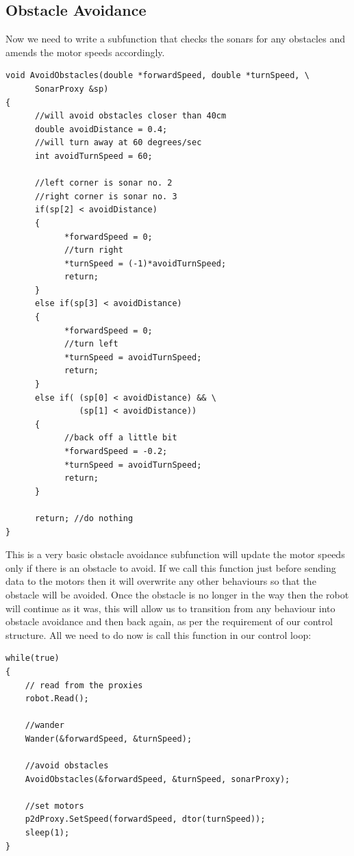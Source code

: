 \documentclass[a4paper]{report}
\begin{document}
\subsection{Obstacle Avoidance}
Now we need to write a subfunction that checks the sonars for any obstacles and amends the motor speeds accordingly.
\begin{verbatim}
void AvoidObstacles(double *forwardSpeed, double *turnSpeed, \
      SonarProxy &sp)
{
      //will avoid obstacles closer than 40cm
      double avoidDistance = 0.4;
      //will turn away at 60 degrees/sec
      int avoidTurnSpeed = 60;
      
      //left corner is sonar no. 2
      //right corner is sonar no. 3
      if(sp[2] < avoidDistance)
      {
            *forwardSpeed = 0;
            //turn right
            *turnSpeed = (-1)*avoidTurnSpeed;
            return;
      }
      else if(sp[3] < avoidDistance)
      {
            *forwardSpeed = 0;
            //turn left
            *turnSpeed = avoidTurnSpeed;
            return;
      }
      else if( (sp[0] < avoidDistance) && \
               (sp[1] < avoidDistance))
      {
            //back off a little bit
            *forwardSpeed = -0.2;
            *turnSpeed = avoidTurnSpeed;  
            return;
      }
      
      return; //do nothing
}
\end{verbatim}
This is a very basic obstacle avoidance subfunction will update the motor speeds only if there is an obstacle to avoid. If we call this function just before sending data to the motors then it will overwrite any other behaviours so that the obstacle will be avoided. Once the obstacle is no longer in the way then the robot will continue as it was, this will allow us to transition from any behaviour into obstacle avoidance and then back again, as per the requirement of our control structure. All we need to do now is call this function in our control loop:
\begin{verbatim}
while(true)
{		
    // read from the proxies
    robot.Read();
		
    //wander
    Wander(&forwardSpeed, &turnSpeed);
		
    //avoid obstacles
    AvoidObstacles(&forwardSpeed, &turnSpeed, sonarProxy);
		
    //set motors
    p2dProxy.SetSpeed(forwardSpeed, dtor(turnSpeed));
    sleep(1);
}
\end{verbatim}
\end{document}
